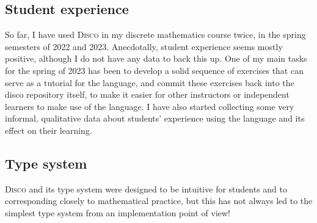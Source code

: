 \documentclass[submission,copyright,creativecommons]{eptcs}
\newcommand{\disco}{\textsc{Disco}\xspace}
\begin{document}
\subsection{Student experience}
\label{sec:students}

So far, I have used \disco in my discrete mathematics course twice, in
the spring semesters of 2022 and 2023.  Anecdotally, student
experience seems mostly positive, although I do not have any data to
back this up.  One of my main tasks for the spring of 2023 has been to
develop a solid sequence of exercises that can serve as a tutorial for
the language, and commit these exercises back into the disco
repository itself, to make it easier for other instructors or
independent learners to make use of the language.  I  have also
started collecting some very informal, qualitative data about students'
experience using the language and its effect on their learning.

\subsection{Type system}
\label{sec:types}

\disco and its type system were designed to be intuitive for students
and to corresponding closely to mathematical practice, but this has
not always led to the simplest type system from an implementation
point of view!
\end{document}
